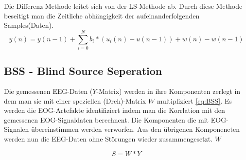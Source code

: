 \documentclass[preprint,12pt]{elsarticle}
\begin{document}
Die Differenz Methode leitet sich von der LS-Methode ab. Durch diese Methode beseitigt man die Zeitliche abhängigkeit der aufeinanderfolgenden Samples(Daten).
~\cite{Thulasidas2004}
\begin{equation} \label{eq:DM}
 y(n) = y(n − 1) + \sum_{i=0}^{N}  b_i * (u_i(n) - u(n - 1)) + w(n) - w(n - 1)
\end{equation}



\subsection{BSS - Blind Source Seperation}
Die gemessenen EEG-Daten ($Y$-Matrix) werden in ihre Komponenten zerlegt in dem man sie mit einer speziellen (Dreh)-Matrix $W$ multipliziert \ref{eq:BSS}.
Es werden die EOG-Artefakte identifiziert indem man die Korrlation mit den gemessenen EOG-Signaldaten  berechnent. Die Komponenten die mit EOG-Signalen übereinstimmen werden
verworfen. Aus den übrigenen Komponeneten werden nun die EEG-Daten ohne Störungen wieder zusammengesetzt.
$W$
~\cite{Thulasidas2004}

\begin{equation} \label{eq:BSS}
 S = W*Y
\end{equation}
















\end{document}
